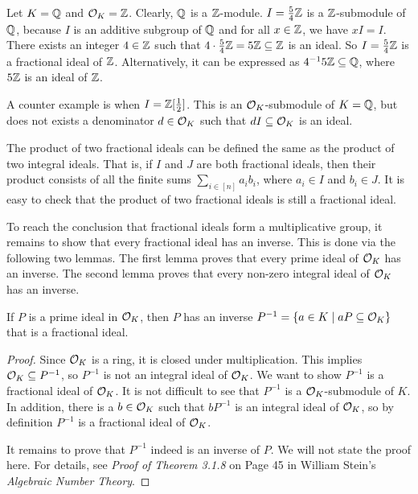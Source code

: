 \documentclass[../main.tex]{subfiles}
\begin{document}
\begin{example}
Let $K= \mathbb{Q}$ and $\mathcal{O}_K= \mathbb{Z}$. Clearly, $\mathbb{Q}$ is a $\mathbb{Z}$-module. $I = \frac{5}{4}\mathbb{Z}$ is a $\mathbb{Z}$-submodule of $\mathbb{Q}$, because $I$ is an additive subgroup of $\mathbb{Q}$ and for all $x \in \mathbb{Z}$, we have $xI = I$. There exists an integer $4\in \mathbb{Z}$ such that $4 \cdot \frac{5}{4}\mathbb{Z} = 5\mathbb{Z} \subseteq\mathbb{Z}$ is an ideal. So  $I = \frac{5}{4}\mathbb{Z}$ is a fractional ideal of $\mathbb{Z}$. Alternatively, it can be expressed as $4^{-1}5\mathbb{Z} \subseteq \mathbb{Q}$, where $5\mathbb{Z}$ is an ideal of $\mathbb{Z}$.

A counter example is when $I=\mathbb{Z}[\frac{1}{2}]$. This is an $\mathcal{O}_K$-submodule of $K=\mathbb{Q}$, but does not exists a denominator $d \in \mathcal{O}_K$ such that $dI \subseteq \mathcal{O}_K$ is an ideal. 
\end{example}


The product of two fractional ideals can be defined the same as the product of two 
\reversemarginpar
{}
integral ideals. That is, if $I$ and $J$ are both fractional ideals, then their product consists of all the finite sums $\sum_{i \in [n]} a_i b_i$, where $a_i \in I$ and $b_i \in J$. It is easy to check that the product of two fractional ideals is still a fractional ideal. 


To reach the conclusion that fractional ideals form a multiplicative group, it remains to show that every fractional ideal has an inverse. This is done via the following two lemmas. The first lemma proves that every prime ideal of $\mathcal{O}_K$ has an inverse. The second lemma proves that every non-zero integral ideal of $\mathcal{O}_K$ has an inverse. 

\begin{lemma}
\reversemarginpar
{}
If $P$ is a prime ideal in $\mathcal{O}_K$, then $P$ has an inverse $P^{-1} = \{a \in K \mid a P \subseteq \mathcal{O}_K\}$ that is a fractional ideal.
\end{lemma}

\begin{proof}
Since $\mathcal{O}_K$ is a ring, it is closed under multiplication. This implies $\mathcal{O}_K \subseteq P^{-1}$, so $P^{-1}$ is not an integral ideal of $\mathcal{O}_K$. We want to show $P^{-1}$ is a fractional ideal of $\mathcal{O}_K$. It is not difficult to see that $P^{-1}$ is a $\mathcal{O}_K$-submodule of $K$. In addition, there is a $b \in \mathcal{O}_K$ such that $bP^{-1}$ is an integral ideal of $\mathcal{O}_K$, so by definition $P^{-1}$ is a fractional ideal of $\mathcal{O}_K$. 

It remains to prove that $P^{-1}$ indeed is an inverse of $P$. We will not state the proof here. For details, see \textit{Proof of Theorem 3.1.8} on Page 45 in William Stein's \textit{Algebraic Number Theory}.
\end{proof}
\end{document}
